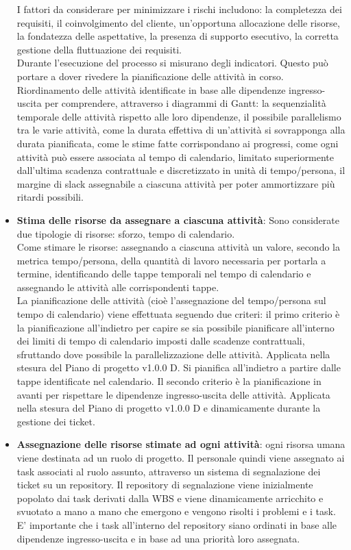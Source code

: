 \begin{itemize}
     I fattori da considerare per minimizzare i rischi includono: la completezza dei requisiti, il coinvolgimento del cliente, un'opportuna allocazione delle risorse, la fondatezza delle aspettative, la presenza di supporto esecutivo, la corretta gestione della fluttuazione dei requisiti.\\
     Durante l'esecuzione del processo si misurano degli indicatori. Questo può portare a dover rivedere la pianificazione delle attività in corso. \\
     Riordinamento delle attività identificate in base alle dipendenze ingresso-uscita per comprendere, attraverso i diagrammi di Gantt: la sequenzialità temporale delle attività rispetto alle loro dipendenze, il possibile parallelismo tra le varie attività, come la durata effettiva di un'attività si sovrapponga alla durata pianificata, come le stime fatte corrispondano ai progressi, come ogni attività può essere associata al tempo di calendario, limitato superiormente dall'ultima scadenza contrattuale e discretizzato in unità di tempo/persona, il margine di slack assegnabile a ciascuna attività per poter ammortizzare più ritardi possibili.
    \item \textbf{Stima delle risorse da assegnare a ciascuna attività}: Sono considerate due tipologie di risorse: sforzo, tempo di calendario. \\
     Come stimare le risorse: assegnando a ciascuna attività un valore, secondo la metrica tempo/persona, della quantità di lavoro necessaria per portarla a termine, identificando delle tappe temporali nel tempo di calendario e assegnando le attività alle corrispondenti tappe.\\
     La pianificazione delle attività (cioè l'assegnazione del tempo/persona sul tempo di calendario) viene effettuata seguendo due criteri: il primo criterio è la pianificazione all'indietro per capire se sia possibile pianificare all'interno dei limiti di tempo di calendario imposti dalle scadenze contrattuali, sfruttando dove possibile la parallelizzazione delle attività. Applicata nella stesura del Piano di progetto v1.0.0 D. Si pianifica all'indietro a partire dalle tappe identificate nel calendario. Il secondo criterio è la pianificazione in avanti per rispettare le dipendenze ingresso-uscita delle attività. Applicata nella stesura del Piano di progetto v1.0.0 D e dinamicamente durante la gestione dei ticket.
    \item \textbf{Assegnazione delle risorse stimate ad ogni attività}: ogni risorsa umana viene destinata ad un ruolo di progetto. Il personale quindi viene assegnato ai task associati al ruolo assunto, attraverso un sistema di segnalazione dei ticket su un repository. Il repository di segnalazione viene inizialmente popolato dai task derivati dalla WBS e viene dinamicamente arricchito e svuotato a mano a mano che emergono e vengono risolti i problemi e i task. E' importante che i task all'interno del repository siano ordinati in base alle dipendenze ingresso-uscita e in base ad una priorità loro assegnata.
\end{itemize}

